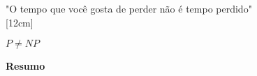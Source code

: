 \documentclass[12pt,a4paper,openany]{book} %
\begin{document}
	
	\newpage
	\begin{center}
		\vspace*{\fill}
		"O tempo que você gosta de perder não é tempo perdido" \\ 
		[12cm]
	\end{center}
	
	\newpage
	\begin{center}
		\vspace*{\fill}
		$ P \neq NP $ \\ 
		[12cm]
	\end{center}

	\tableofcontents
	\listoffigures
	
	\newpage
	\begin{center}
		\textbf{\LARGE Resumo}
	\end{center}
	
\end{document}
